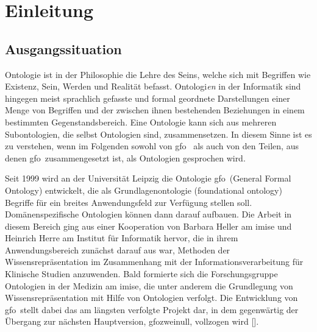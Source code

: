 \chapter{Einleitung}\label{chap:einleitung}

\section{Ausgangssituation}
    Ontologie
    ist in der Philosophie die Lehre des Seins, welche sich mit Begriffen wie Existenz, Sein, Werden und Realität befasst.
    Ontologi\textit{en} in der Informatik sind hingegen meist sprachlich gefasste und formal geordnete Darstellungen einer Menge von Begriffen und der zwischen ihnen bestehenden Beziehungen in einem
    bestimmten Gegenstandsbereich. 
    Eine Ontologie kann sich aus mehreren Subontologien, die selbst Ontologien sind, zusammensetzen. In diesem Sinne ist es zu verstehen, wenn im Folgenden sowohl von \ac{gfo}\ 
    als auch von den Teilen, aus denen \ac{gfo}\ zusammengesetzt ist, als Ontologien gesprochen wird.

    Seit
    \marginpar{General Formal Ontology (GFO)}
    1999 wird an der Universität Leipzig die Ontologie \ac{gfo}\ (General Formal Ontology) entwickelt, die als Grundlagenontologie (foundational ontology) Begriffe für ein breites Anwendungsfeld zur Verfügung stellen soll. 
    Domänenspezifische Ontologien können dann darauf aufbauen.
        Die Arbeit in diesem Bereich ging aus einer Kooperation von Barbara 
		Heller am \ac{imise}
		und Heinrich Herre am	Institut für Informatik hervor, 
		die in ihrem Anwendungsbereich zunächst darauf aus war,
		Methoden der Wissensrepräsentation im Zusammenhang mit der Informationsverarbeitung
		für Klinische Studien	anzuwenden.
		Bald formierte sich die Forschungsgruppe %
		Ontologien in der Medizin
		am \ac{imise},
		die unter anderem die Grundlegung von Wissensrepräsentation mit Hilfe von Ontologien
		verfolgt.
		Die Entwicklung von \ac{gfo}\ stellt dabei das am längsten verfolgte Projekt dar,
		in dem gegenwärtig der Übergang zur nächsten Hauptversion, \ac{gfozweinull}, vollzogen wird [\cite{burek-p-2020-32-a}].
		
